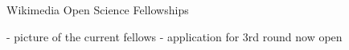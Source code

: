 \begin{frame}{Wikimedia Open Science Fellowships}

  - picture of the current fellows
  - application for 3rd round now open
  
\end{frame}
